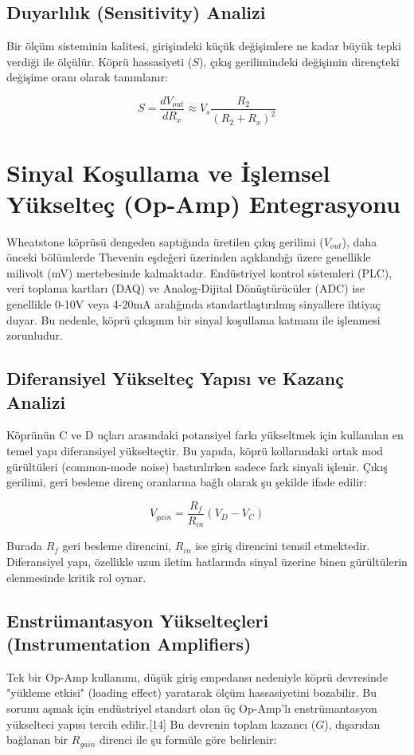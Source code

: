 \documentclass[12pt,a4paper]{article}
\begin{document}
\subsection{Duyarlılık (Sensitivity) Analizi}
Bir ölçüm sisteminin kalitesi, girişindeki küçük değişimlere ne kadar büyük tepki verdiği ile ölçülür. Köprü hassasiyeti ($S$), çıkış gerilimindeki değişimin dirençteki değişime oranı olarak tanımlanır:

\begin{equation}
    S = \frac{dV_{out}}{dR_x} \approx V_s \frac{R_2}{(R_2 + R_x)^2}
\end{equation}

\section{Sinyal Koşullama ve İşlemsel Yükselteç (Op-Amp) Entegrasyonu}
Wheatstone köprüsü dengeden saptığında üretilen çıkış gerilimi ($V_{out}$), daha önceki bölümlerde Thevenin eşdeğeri üzerinden açıklandığı üzere genellikle milivolt (mV) mertebesinde kalmaktadır. Endüstriyel kontrol sistemleri (PLC), veri toplama kartları (DAQ) ve Analog-Dijital Dönüştürücüler (ADC) ise genellikle 0-10V veya 4-20mA aralığında standartlaştırılmış sinyallere ihtiyaç duyar. Bu nedenle, köprü çıkışının bir sinyal koşullama katmanı ile işlenmesi zorunludur.

\subsection{Diferansiyel Yükselteç Yapısı ve Kazanç Analizi}
Köprünün C ve D uçları arasındaki potansiyel farkı yükseltmek için kullanılan en temel yapı diferansiyel yükselteçtir. Bu yapıda, köprü kollarındaki ortak mod gürültüleri (common-mode noise) bastırılırken sadece fark sinyali işlenir. Çıkış gerilimi, geri besleme direnç oranlarına bağlı olarak şu şekilde ifade edilir:

\begin{equation}
    V_{gain} = \frac{R_{f}}{R_{in}} (V_D - V_C)
\end{equation}

Burada $R_f$ geri besleme direncini, $R_{in}$ ise giriş direncini temsil etmektedir. Diferansiyel yapı, özellikle uzun iletim hatlarında sinyal üzerine binen gürültülerin elenmesinde kritik rol oynar.

\subsection{Enstrümantasyon Yükselteçleri (Instrumentation Amplifiers)}
Tek bir Op-Amp kullanımı, düşük giriş empedansı nedeniyle köprü devresinde "yükleme etkisi" (loading effect) yaratarak ölçüm hassasiyetini bozabilir. Bu sorunu aşmak için endüstriyel standart olan üç Op-Amp'lı enstrümantasyon yükselteci yapısı tercih edilir.[14] Bu devrenin toplam kazancı ($G$), dışarıdan bağlanan bir $R_{gain}$ direnci ile şu formüle göre belirlenir:
\end{document}
